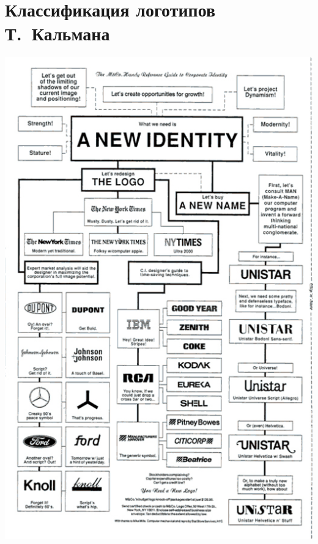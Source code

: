 \section{Классификация логотипов Т.~Кальмана}
\label{app:kalman}
\centering
\includegraphics[width=.8\linewidth]{images/supplement/kalman}
